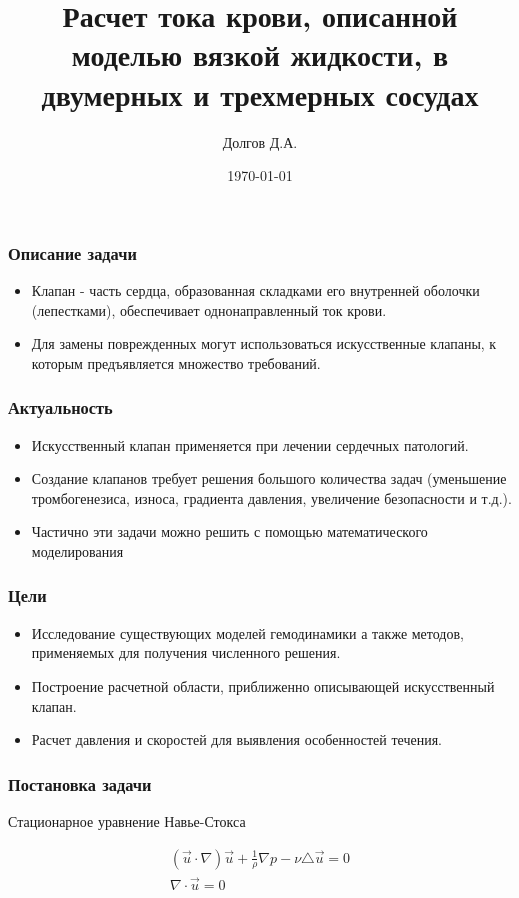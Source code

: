 \documentclass[14pt]{beamer}
\title{Расчет тока крови, описанной моделью вязкой жидкости, в двумерных и трехмерных сосудах}
\date{\today}
\author{Долгов Д.А.}
\institute{Кемеровский Государственный Университет \\
    \vspace{0.7cm}
    Научный руководитель:  д.ф.-м.н Ю.Н. Захаров \\
    \vspace{0.7cm}
}
\begin{document}
\maketitle

\begin{frame}
\frametitle{Описание задачи}
\begin{center}
\begin{itemize}
	\item Клапан - часть сердца, образованная складками его внутренней оболочки (лепестками), обеспечивает однонаправленный ток крови.
	\item Для замены поврежденных могут использоваться искусственные клапаны, к которым предъявляется множество требований.
\end{itemize}
\end{center}

\end{frame}

\begin{frame}
\frametitle{Актуальность}
\begin{itemize}
	\item Искусственный клапан применяется при лечении сердечных патологий.
	\item Создание клапанов требует решения большого количества задач (уменьшение тромбогенезиса, износа, градиента давления, увеличение безопасности и т.д.).
    \item Частично эти задачи можно решить с помощью математического моделирования
\end{itemize}
\end{frame}

\begin{frame}
\frametitle{Цели}
\begin{itemize}
	\item Исследование существующих моделей гемодинамики а также методов, применяемых для получения численного решения.
	\item Построение расчетной области, приближенно описывающей искусственный клапан.
	\item Расчет давления и скоростей для выявления особенностей течения.
\end{itemize}
\end{frame}

\begin{frame}
\frametitle{Постановка задачи}
Стационарное уравнение Навье-Стокса

\begin{gather}
\label{eq:SteadyNavierStokesMotion}
(\vec u \cdot \nabla)\vec u + \frac{1}{\rho}\nabla p - \nu \triangle \vec u = 0\\
\label{eq:ContinuityEquation}
\nabla \cdot \vec u = 0
\end{gather}
\end{frame}
\end{document}
